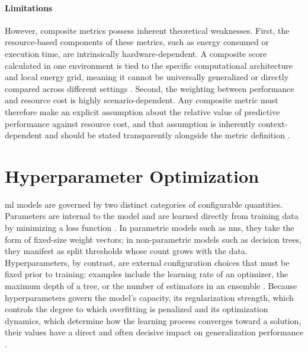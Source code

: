 \paragraph{Limitations}
However, composite metrics possess inherent theoretical weaknesses. First, the resource-based components of these metrics, such as energy consumed or execution time, are intrinsically hardware-dependent. A composite score calculated in one environment is tied to the specific computational architecture and local energy grid, meaning it cannot be universally generalized or directly compared across different settings \parencite{schwartzGreenAI2020, dodgeMeasuringCarbonIntensity2022}. Second, the weighting between performance and resource cost is highly scenario-dependent. Any composite metric must therefore make an explicit assumption about the relative value of predictive performance against resource cost, and that assumption is inherently context-dependent and should be stated transparently alongside the metric definition \parencite{hendersonSystematicReportingEnergy2020}.

\section{Hyperparameter Optimization}
\label{sec:theoretical_hpo}

\gls{ml} models are governed by two distinct categories of configurable quantities. Parameters are internal to the model and are learned directly from training data by minimizing a loss function \parencite{yangHyperparameterOptimizationMachine2020}. In parametric models such as \glspl{nn}, they take the form of fixed-size weight vectors; in non-parametric models such as decision trees, they manifest as split thresholds whose count grows with the data. Hyperparameters, by contrast, are external configuration choices that must be fixed prior to training: examples include the learning rate of an optimizer, the maximum depth of a tree, or the number of estimators in an ensemble \parencite{yangHyperparameterOptimizationMachine2020}. Because hyperparameters govern the model's capacity, its regularization strength, which controls the degree to which overfitting is penalized and its optimization dynamics, which determine how the learning process converges toward a solution, their values have a direct and often decisive impact on generalization performance \parencite{bergstraRandomSearchHyperParameter2012, yangHyperparameterOptimizationMachine2020}.

